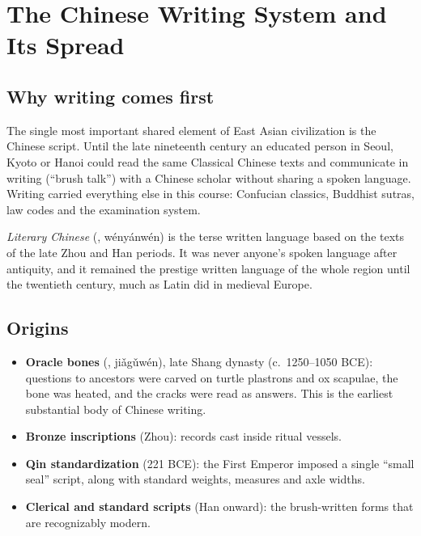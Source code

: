 \chapter{The Chinese Writing System and Its Spread}

\section{Why writing comes first}

The single most important shared element of East Asian civilization is the Chinese
script. Until the late nineteenth century an educated person in Seoul, Kyoto or Hanoi could
read the same Classical Chinese texts and communicate in writing (``brush talk'') with a
Chinese scholar without sharing a spoken language. Writing carried everything else in this
course: Confucian classics, Buddhist sutras, law codes and the examination system.

\begin{definition}
\emph{Literary Chinese} (, wényánwén) is the terse written language based on
the texts of the late Zhou and Han periods. It was never anyone's spoken language after
antiquity, and it remained the prestige written language of the whole region until the
twentieth century, much as Latin did in medieval Europe.
\end{definition}

\section{Origins}

\begin{itemize}
  \item \textbf{Oracle bones} (, jiǎgǔwén), late Shang dynasty (c.\ 1250--1050
        BCE): questions to ancestors were carved on turtle plastrons and ox scapulae, the
        bone was heated, and the cracks were read as answers. This is the earliest
        substantial body of Chinese writing.
  \item \textbf{Bronze inscriptions} (Zhou): records cast inside ritual vessels.
  \item \textbf{Qin standardization} (221 BCE): the First Emperor imposed a single
        ``small seal'' script, along with standard weights, measures and axle widths.
  \item \textbf{Clerical and standard scripts} (Han onward): the brush-written forms that
        are recognizably modern.
\end{itemize}

